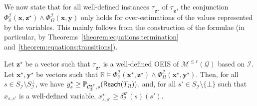 \documentclass[a4paper,UKenglish,cleveref,autoref,thm-restate,colorlinks]{lipics-v2021}
\newcommand{\IR}{\mathbb{R}}
\newcommand{\mdp}{\mathcal{M}}
\newcommand{\mdpStateSpace}{S}
\newcommand{\mdpTrans}{\delta}
\newcommand{\ocmdp}{\mathcal{Q}}
\newcommand{\ocmdpFin}[2]{\mdp^{\leq #2}(#1)}
\newcommand{\ocConfig}{s}
\newcommand{\ocTrans}{\delta}
\newcommand{\counterUB}{r}
\newcommand{\mchain}{\mathcal{C}}
\newcommand{\intPart}{\mathcal{I}}
\newcommand{\compressChainStrat}[1]{\mchain^{#1}_{\intPart}}
\newcommand{\compressChainStateSpace}{\mdpStateSpace_{\intPart}}
\newcommand{\compressChainStateSpaceStar}{\mdpStateSpace_{\intPart}^{\bot}}
\newcommand{\compressChainTransTemplate}[2]{\mdpTrans^{#1}_{#2}}
\newcommand{\varTrans}{x}
\newcommand{\varTransTuple}{\mathbf{\varTrans}}
\newcommand{\solTrans}{\varTrans^\star}
\newcommand{\solTransTuple}{\mathbf{\varTrans}^{\star}}
\newcommand{\varObj}{y}
\newcommand{\varObjTuple}{\mathbf{\varObj}}
\newcommand{\solObj}{\varObj^{\star}}
\newcommand{\solObjTuple}{\mathbf{\varObj}^{\star}}
\newcommand{\varStrat}{z}
\newcommand{\varStratTuple}{\mathbf{\varStrat}}
\newcommand{\solStratTuple}{\mathbf{\varStrat}^{\star}}
\newcommand{\compressChainSymSol}{\compressChainStrat{\solStratTuple}}
\newcommand{\compressChainTransSymSol}{\compressChainTransTemplate{\solStratTuple}{\intPart}}
\newcommand{\formulaTransBase}{\Phi_{\ocTrans}}
\newcommand{\formulaObjBase}{\Phi_{\objective}}
\newcommand{\formulaTrans}{\formulaTransBase^\intPart}
\newcommand{\formulaObj}{\formulaObjBase^\intPart}
\newcommand{\objective}{\Omega}
\newcommand{\reach}[1]{\mathsf{Reach}(#1)}
\newcommand{\target}{T}
\newcommand{\stratBGeneric}[1]{{\tau_{#1}}}
\newcommand{\stratB}{\stratBGeneric{}}
\begin{document}
We now state that for all well-defined instances $\stratB_{\solStratTuple}$ of $\stratB_{\varStratTuple}$, the conjunction $\formulaTrans(\varTransTuple,\solStratTuple)\land\formulaObj(\varTransTuple, \varObjTuple)$ only holds for over-estimations of the values represented by the variables.
This mainly follows from the construction of the formulae (in particular, by Theorems~\ref{theorem:equations:termination} and~\ref{theorem:equations:transitions}).
\begin{lemma}\label{lemma:verification:oeis:least assignment}
  Let $\solStratTuple$ be a vector such that $\stratB_{\solStratTuple}$ is a well-defined OEIS of $\ocmdpFin{\ocmdp}{\counterUB}$ based on $\intPart$.
  Let $\solTransTuple, \solObjTuple$ be vectors such that $\IR\models\formulaTrans(\solTransTuple,\solStratTuple)\land\formulaObj(\solTransTuple, \solObjTuple)$.
  Then, for all $\ocConfig\in\compressChainStateSpace\setminus\compressChainStateSpaceStar$, we have $\solObj_{\ocConfig}\geq\probaMCverb{\compressChainSymSol}{\ocConfig}(\reach{\target_\objective})$, and, for all $\ocConfig'\in\compressChainStateSpace\setminus\{\bot\}$ such that $\varTrans_{\ocConfig,\ocConfig'}$ is a well-defined variable, $\solTrans_{\ocConfig, \ocConfig'}\geq\compressChainTransSymSol(\ocConfig)(\ocConfig')$.
\end{lemma}
\end{document}
